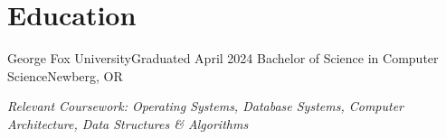 \section{Education}
  \resumeSubHeadingListStart
    \resumeSubheading
        {George Fox University}{Graduated April 2024}
        {Bachelor of Science in Computer Science}{Newberg, OR}
        {\item{\small{\textit{Relevant Coursework: Operating Systems, Database Systems, Computer Architecture, Data Structures \& Algorithms}}}}
  \resumeSubHeadingListEnd
